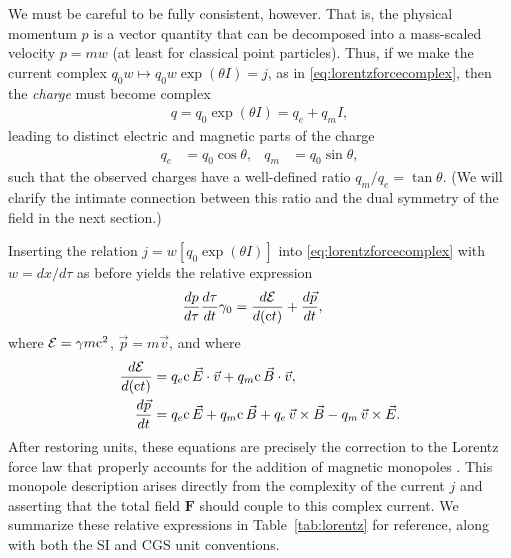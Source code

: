 \documentclass[1p,sort&compress]{elsarticle}
\numberwithin{equation}{section}
\newcommand{\rv}[1]{\vec{#1}}
\newcommand{\bv}[1]{\mathbf{#1}}
\newcommand{\cc}{{\rm c}}
\begin{document}
We must be careful to be fully consistent, however.  That is, the physical momentum $p$ is a vector quantity that can be decomposed into a mass-scaled velocity $p = m w$ (at least for classical point particles).  Thus, if we make the current complex $q_0w\mapsto q_0w\exp(\theta I) = j$, as in \eqref{eq:lorentzforcecomplex}, then the \emph{charge} must become complex
\begin{align}
  q = q_0 \exp(\theta I) = q_e + q_m I,
\end{align}
leading to distinct electric and magnetic parts of the charge 
\begin{align}
  q_e &= q_0\cos\theta, & q_m &= q_0\sin\theta,
\end{align}
such that the observed charges have a well-defined ratio $q_m/q_e = \tan\theta$.  (We will clarify the intimate connection between this ratio and the dual symmetry of the field in the next section.)

Inserting the relation $j = w[q_0\exp(\theta I)]$ into \eqref{eq:lorentzforcecomplex} with $w = dx/d\tau$ as before yields the relative expression
\begin{align}
  \frac{dp}{d\tau}\frac{d\tau}{dt}\gamma_0 &= \frac{d\mathcal{E}}{d(\cc t)} + \frac{d\rv{p}}{dt},
\end{align}
where $\mathcal{E} = \gamma m \cc^2$, $\rv{p} = m\rv{v}$, and where
\begin{subequations}\label{eq:lorentzforcemonopole}
\begin{align}
  \frac{d\mathcal{E}}{d(\cc t)} &= q_e \cc\,\rv{E}\cdot\rv{v} + q_m \cc\,\rv{B}\cdot\rv{v}, \\
  \frac{d\rv{p}}{dt} &= q_e \cc\,\rv{E} + q_m \cc\,\rv{B} + q_e\, \rv{v}\times\rv{B} - q_m \, \rv{v}\times\rv{E}. 
\end{align}
\end{subequations}
After restoring units, these equations are precisely the correction to the Lorentz force law that properly accounts for the addition of magnetic monopoles \cite{Dirac1931,Dirac1948,Cabibbo1962,Schwinger1966b,Rohrlich1966,Zwanziger1968,Zwanziger1971,Han1971,Mignani1975,Deser1976,Deser1982,Gambini1979,Gambini1980,Schwartz1994,Pasti1995,Singleton1995,Singleton1996,Khoudeir1996,Kato2002,Shnir2005}.  This monopole description arises directly from the complexity of the current $j$ and asserting that the total field $\bv{F}$ should couple to this complex current.  We summarize these relative expressions in Table~\ref{tab:lorentz} for reference, along with both the SI and CGS unit conventions.
\end{document}

